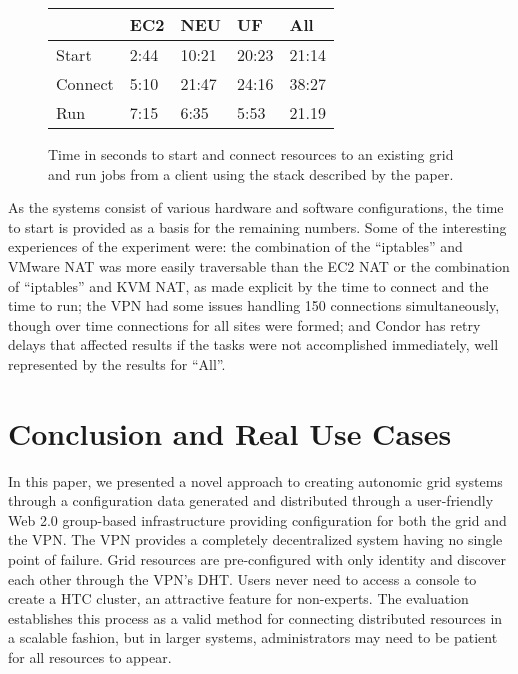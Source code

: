 \documentclass{sig-alternate}
\begin{document}
\begin{small}
\begin{figure}[ht]
\setlength{\itemsep}{0pt}
\setlength{\parskip}{0pt}
\centering
\begin{tabular}[c]{|m{1.5cm}||m{1.2cm}|m{1.2cm}|m{1.2cm}|m{1.2cm}|} \hline
& EC2 & NEU & UF & All \\ \hline\hline
Start & 2:44 & 10:21 & 20:23 & 21:14 \\ \hline
Connect & 5:10 & 21:47 & 24:16 & 38:27\\ \hline
Run & 7:15 & 6:35 & 5:53 & 21.19 \\ \hline
\end{tabular}
\caption{Time in seconds to start and connect resources to an existing
grid and run jobs from a client using the stack described by the paper.}
\label{fig:results}
\end{figure}
\end{small}

As the systems consist of various hardware and software configurations, the
time to start is provided as a basis for the remaining numbers.  Some of the
interesting experiences of the experiment were:  the combination of the
``iptables'' and VMware NAT was more easily traversable than the EC2
NAT or the combination of ``iptables'' and KVM NAT, as made explicit by the
time to connect and the time to run; the VPN had some issues handling 150
connections simultaneously, though over time connections for all sites were
formed; and Condor has retry delays that affected results if the tasks
were not accomplished immediately, well represented by the results for ``All''.

\section{Conclusion and Real Use Cases}
\label{conclusion}
In this paper, we presented a novel approach to creating autonomic grid systems
through a configuration data generated and distributed through a user-friendly
Web 2.0 group-based infrastructure providing configuration for both the grid
and the VPN.  The VPN provides a completely decentralized system having no
single point of failure.  Grid resources are pre-configured with only identity
and discover each other through the VPN's DHT.  Users never need to access a
console to create a HTC cluster, an attractive feature for non-experts.  The
evaluation establishes this process as a valid method for connecting distributed
resources in a scalable fashion, but in larger systems, administrators may need
to be patient for all resources to appear.
\end{document}
